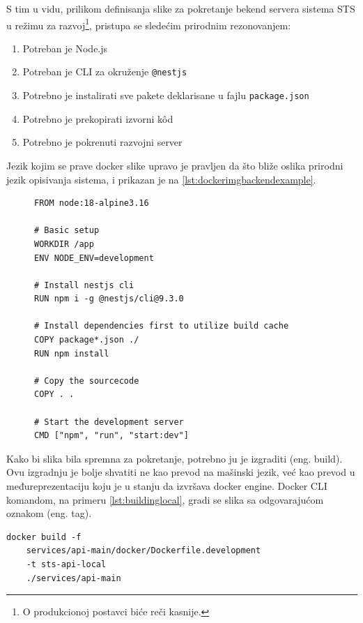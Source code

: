 \documentclass[12pt,oneside]{memoir}
\begin{document}
S tim u vidu, prilikom definisanja slike za pokretanje bekend servera sistema STS u režimu za razvoj\footnote{O produkcionoj postavci biće reči kasnije.}, pristupa se sledećim prirodnim rezonovanjem:

\begin{enumerate}
    \item Potreban je Node.js
    \item Potreban je CLI za okruženje \verb|@nestjs|
    \item Potrebno je instalirati sve pakete deklarisane u fajlu \verb|package.json|
    \item Potrebno je prekopirati izvorni k\^{o}d
    \item Potrebno je pokrenuti razvojni server
\end{enumerate}

Jezik kojim se prave docker slike upravo je pravljen da što bliže oslika prirodni jezik opisivanja sistema, i prikazan je na \ref{lst:dockerimgbackendexample}.

\begin{figure}[h]
\begin{lstlisting}[language=docker, caption={Slika za bekend server}, label={lst:dockerimgbackendexample}]
FROM node:18-alpine3.16

# Basic setup
WORKDIR /app
ENV NODE_ENV=development

# Install nestjs cli
RUN npm i -g @nestjs/cli@9.3.0

# Install dependencies first to utilize build cache
COPY package*.json ./
RUN npm install

# Copy the sourcecode
COPY . .

# Start the development server
CMD ["npm", "run", "start:dev"]
\end{lstlisting}
\end{figure}

Kako bi slika bila spremna za pokretanje, potrebno ju je izgraditi (eng. build). Ovu izgradnju je bolje shvatiti ne kao prevod na mašinski jezik, već kao prevod u međureprezentaciju koju je u stanju da izvršava docker engine. Docker CLI komandom, na primeru \ref{lst:buildinglocal}, gradi se slika sa odgovarajućom oznakom (eng. tag).

\begin{lstlisting}[caption={Izgradnja slike za bekend deo STS aplikacije.}, label={lst:buildinglocal}]
docker build -f
    services/api-main/docker/Dockerfile.development 
    -t sts-api-local 
    ./services/api-main 
\end{lstlisting}
\end{document}
